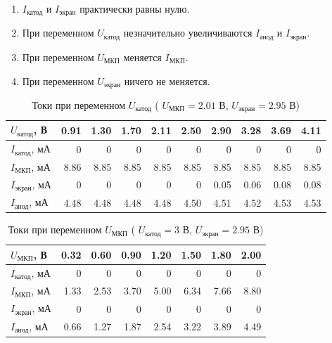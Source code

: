 \documentclass[a4paper,12pt]{article} %
\begin{document}
\begin{enumerate}
\item $I_\text{катод}$ и $I_\text{экран}$ практически равны нулю.
\item При переменном $U_\text{катод}$ незначительно увеличиваются $I_\text{анод}$ и $I_\text{экран}$.
\item При переменном $U_\text{МКП}$ меняется $I_\text{МКП}$.
\item При переменном $U_\text{экран}$ ничего не меняется.
\end{enumerate}

\begin{table}[h]
\centering
\begin{tabular}{|l|r|r|r|r|r|r|r|r|r|}
\hline
$U_\text{катод}$, В  & 0.91 & 1.30 & 1.70 & 2.11 & 2.50 & 2.90 & 3.28 & 3.69 & 4.11 \\ \hline
$I_\text{катод}$, мА & 0    & 0    & 0    & 0    & 0    & 0    & 0    & 0    & 0    \\ \hline
$I_\text{МКП}$, мА   & 8.86 & 8.85 & 8.85 & 8.85 & 8.85 & 8.85 & 8.85 & 8.85 & 8.85 \\ \hline
$I_\text{экран}$, мА & 0    & 0    & 0    & 0    & 0    & 0.05 & 0.06 & 0.08 & 0.08 \\ \hline
$I_\text{анод}$, мА  & 4.48 & 4.48 & 4.48 & 4.48 & 4.50 & 4.51 & 4.52 & 4.53 & 4.53 \\ \hline
\end{tabular}
\caption{Токи при переменном $U_\text{катод}$ ( $U_\text{МКП} = 2.01$ В, $U_\text{экран} = 2.95$ В)}
\label{tab:kat}
\end{table}

\begin{table}[h]
\centering
\begin{tabular}{|l|r|r|r|r|r|r|r|}
\hline
$U_\text{МКП}$, В    & 0.32 & 0.60 & 0.90 & 1.20 & 1.50 & 1.80 & 2.00 \\ \hline
$I_\text{катод}$, мА & 0    & 0    & 0    & 0    & 0    & 0    & 0    \\ \hline
$I_\text{МКП}$, мА   & 1.33 & 2.53 & 3.70 & 5.00 & 6.34 & 7.66 & 8.80 \\ \hline
$I_\text{экран}$, мА & 0    & 0    & 0    & 0    & 0    & 0    & 0    \\ \hline
$I_\text{анод}$, мА  & 0.66 & 1.27 & 1.87 & 2.54 & 3.22 & 3.89 & 4.49 \\ \hline
\end{tabular}
\caption{Токи при переменном $U_\text{МКП} $ ( $U_\text{катод} = 3$ В, $U_\text{экран} = 2.95$ В)}
\label{tab:mkp}
\end{table}
\end{document}
